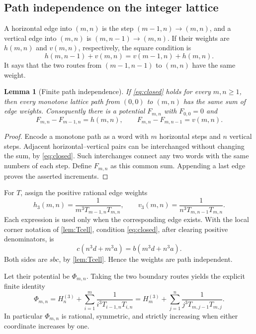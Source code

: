 \documentclass[11pt,letterpaper]{article}
\numberwithin{equation}{section}
\newtheorem{lemma}[theorem]{Lemma}
\theoremstyle{definition}
\newcommand{\Hh}[2]{H_{#1}^{(#2)}}
\begin{document}
\subsection{Path independence on the integer lattice}

A horizontal edge into $(m,n)$ is the step $(m-1,n)\to(m,n)$, and a
vertical edge into $(m,n)$ is $(m,n-1)\to(m,n)$. If their weights are
$h(m,n)$ and $v(m,n)$, respectively, the square condition is
\begin{equation}\label{eq:closed}
 h(m,n-1)+v(m,n)=v(m-1,n)+h(m,n).
\end{equation}
It says that the two routes from $(m-1,n-1)$ to $(m,n)$ have the same
weight.

\begin{lemma}[Finite path independence]\label{lem:path}
If \eqref{eq:closed} holds for every $m,n\geq1$, then every monotone
lattice path from $(0,0)$ to $(m,n)$ has the same sum of edge weights.
Consequently there is a potential $F_{m,n}$ with $F_{0,0}=0$ and
\[
 F_{m,n}-F_{m-1,n}=h(m,n),\qquad
 F_{m,n}-F_{m,n-1}=v(m,n).
\]
\end{lemma}
\begin{proof}
Encode a monotone path as a word with $m$ horizontal steps and $n$
vertical steps. Adjacent horizontal--vertical pairs can be interchanged
without changing the sum, by \eqref{eq:closed}. Such interchanges connect
any two words with the same numbers of each step. Define $F_{m,n}$ as
this common sum. Appending a last edge proves the asserted increments.
\end{proof}

For $T$, assign the positive rational edge weights
\begin{equation}\label{eq:edges3}
 h_3(m,n)=\frac1{m^3T_{m-1,n}T_{m,n}},\qquad
 v_3(m,n)=\frac1{n^3T_{m,n-1}T_{m,n}}.
\end{equation}
Each expression is used only when the corresponding edge exists.
With the local corner notation of \cref{lem:Tcell}, condition
\eqref{eq:closed}, after clearing positive denominators, is
\[
 c(n^3d+m^3a)=b(m^3d+n^3a).
\]
Both sides are $sbc$, by \cref{lem:Tcell}. Hence the weights are
path independent.

Let their potential be $\Phi_{m,n}$. Taking the two boundary routes yields
the explicit finite identity
\begin{equation}\label{eq:U}
 \boxed{\displaystyle
 \Phi_{m,n}=\Hh{n}{3}+\sum_{i=1}^{m}
   \frac1{i^3T_{i-1,n}T_{i,n}}
 =\Hh{m}{3}+\sum_{j=1}^{n}
   \frac1{j^3T_{m,j-1}T_{m,j}}.}
\end{equation}
In particular $\Phi_{m,n}$ is rational, symmetric, and strictly increasing
when either coordinate increases by one.
\end{document}
